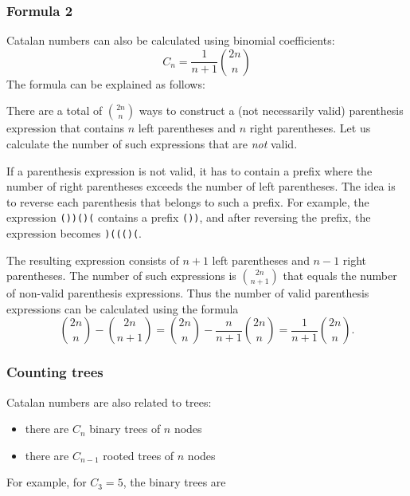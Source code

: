 \subsubsection{Formula 2}

Catalan numbers can also be calculated
using binomial coefficients:
\[ C_n = \frac{1}{n+1} {2n \choose n}\]
The formula can be explained as follows:

There are a total of ${2n \choose n}$ ways
to construct a (not necessarily valid)
parenthesis expression that contains $n$ left
parentheses and $n$ right parentheses.
Let us calculate the number of such
expressions that are \emph{not} valid.

If a parenthesis expression is not valid,
it has to contain a prefix where the
number of right parentheses exceeds the
number of left parentheses.
The idea is to reverse each parenthesis
that belongs to such a prefix.
For example, the expression
\texttt{())()(} contains a prefix \texttt{())},
and after reversing the prefix,
the expression becomes \texttt{)((()(}.

The resulting expression consists of $n+1$
left parentheses and $n-1$ right parentheses.
The number of such expressions is ${2n \choose n+1}$
that equals the number of non-valid
parenthesis expressions.
Thus the number of valid parenthesis
expressions can be calculated using the formula
\[{2n \choose n}-{2n \choose n+1} = {2n \choose n} - \frac{n}{n+1} {2n \choose n} = \frac{1}{n+1} {2n \choose n}.\]

\subsubsection{Counting trees}

Catalan numbers are also related to trees:

\begin{itemize}
\item there are $C_n$ binary trees of $n$ nodes
\item there are $C_{n-1}$ rooted trees of $n$ nodes
\end{itemize}
\noindent
For example, for $C_3=5$, the binary trees are

